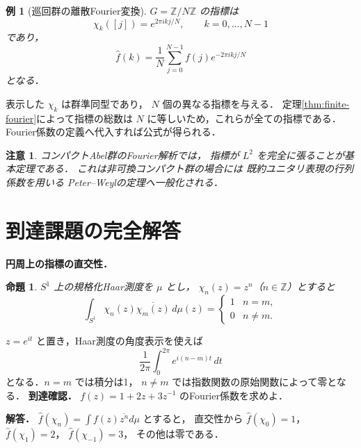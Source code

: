 \documentclass[a5paper,10pt,onecolumn]{jsarticle}
\makeatletter
\theoremstyle{mathnotetheorem}
\newtheorem{proposition}[theorem]{命題}
\newtheorem{example}[theorem]{例}
\newtheorem{remark}[theorem]{注意}
\renewcommand{\proofname}{証明}
\renewenvironment{proof}[1][\proofname]{%
  \par\pushQED{\qed}\normalfont\topsep4\p@\@plus2\p@\relax
  \trivlist\item[\hskip\labelsep\bfseries #1]\ignorespaces
}{\popQED\endtrivlist\@endpefalse}
\makeatother
\begin{document}
\begin{example}[巡回群の離散Fourier変換]
$G=\mathbb Z/N\mathbb Z$ の指標は
\[
 \chi_k([j])=e^{2\pi ikj/N},
 \qquad k=0,\dots,N-1
\]
であり，
\[
 \widehat f(k)=\frac1N\sum_{j=0}^{N-1}
 f(j)e^{-2\pi ikj/N}
\]
となる．
\end{example}
\begin{proof}
表示した $\chi_k$ は群準同型であり，
$N$ 個の異なる指標を与える．
定理\ref{thm:finite-fourier}によって指標の総数は
$N$ に等しいため，これらが全ての指標である．
Fourier係数の定義へ代入すれば公式が得られる．
\end{proof}

\begin{remark}
コンパクトAbel群のFourier解析では，
指標が $L^2$ を完全に張ることが基本定理である．
これは非可換コンパクト群の場合には
既約ユニタリ表現の行列係数を用いる
Peter--Weylの定理へ一般化される．
\end{remark}

\section{到達課題の完全解答}
\noindent\textbf{円周上の指標の直交性．}
\begin{proposition}
$S^1$ 上の規格化Haar測度を $\mu$ とし，
$\chi_n(z)=z^n$（$n\in\mathbb Z$）とすると
\[
\int_{S^1}\chi_n(z)\overline{\chi_m(z)}\,d\mu(z)
=\begin{cases}1&n=m,\\0&n\ne m.\end{cases}
\]
\end{proposition}
\begin{proof}
$z=e^{it}$ と置き，Haar測度の角度表示を使えば
\[
\frac1{2\pi}\int_0^{2\pi}e^{i(n-m)t}\,dt
\]
となる．$n=m$ では積分は1，
$n\ne m$ では指数関数の原始関数によって零となる．
\end{proof}
\noindent\textbf{到達確認．}
$f(z)=1+2z+3z^{-1}$ のFourier係数を求めよ．
\par\noindent\textbf{解答．}
$\widehat f(\chi_n)=\int f(z)\overline{z^n}d\mu$ とすると，
直交性から
$\widehat f(\chi_0)=1$，
$\widehat f(\chi_1)=2$，
$\widehat f(\chi_{-1})=3$，
その他は零である．
\end{document}
